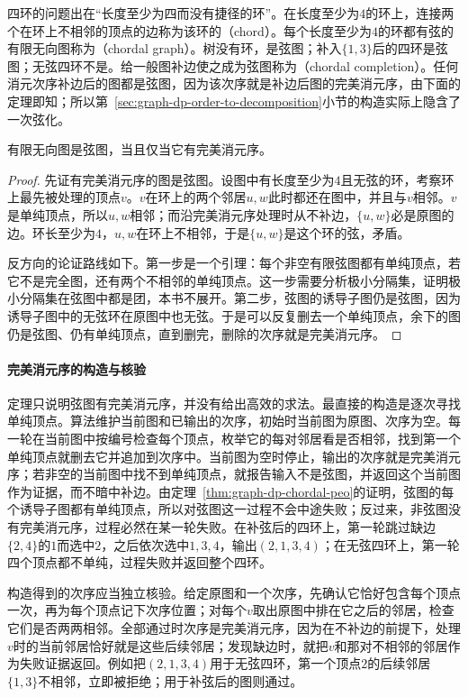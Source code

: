 四环的问题出在“长度至少为四而没有捷径的环”。在长度至少为$4$的环上，连接两个在环上不相邻的顶点的边称为该环的（chord）。每个长度至少为$4$的环都有弦的有限无向图称为（chordal graph）。树没有环，是弦图；补入$\{1,3\}$后的四环是弦图；无弦四环不是。给一般图补边使之成为弦图称为（chordal completion）。任何消元次序补边后的图都是弦图，因为该次序就是补边后图的完美消元序，由下面的定理即知；所以第~\ref{sec:graph-dp-order-to-decomposition}小节的构造实际上隐含了一次弦化。

\begin{theorem}[弦图与完美消元序]
\label{thm:graph-dp-chordal-peo}
有限无向图是弦图，当且仅当它有完美消元序。
\end{theorem}

\begin{proof}
先证有完美消元序的图是弦图。设图中有长度至少为$4$且无弦的环，考察环上最先被处理的顶点$v$。$v$在环上的两个邻居$u,w$此时都还在图中，并且与$v$相邻。$v$是单纯顶点，所以$u,w$相邻；而沿完美消元序处理时从不补边，$\{u,w\}$必是原图的边。环长至少为$4$，$u,w$在环上不相邻，于是$\{u,w\}$是这个环的弦，矛盾。

反方向的论证路线如下。第一步是一个引理：每个非空有限弦图都有单纯顶点，若它不是完全图，还有两个不相邻的单纯顶点。这一步需要分析极小分隔集，证明极小分隔集在弦图中都是团，本书不展开。第二步，弦图的诱导子图仍是弦图，因为诱导子图中的无弦环在原图中也无弦。于是可以反复删去一个单纯顶点，余下的图仍是弦图、仍有单纯顶点，直到删完，删除的次序就是完美消元序。
\end{proof}

\paragraph{完美消元序的构造与核验}
定理只说明弦图有完美消元序，并没有给出高效的求法。最直接的构造是逐次寻找单纯顶点。算法维护当前图和已输出的次序，初始时当前图为原图、次序为空。每一轮在当前图中按编号检查每个顶点，枚举它的每对邻居看是否相邻，找到第一个单纯顶点就删去它并追加到次序中。当前图为空时停止，输出的次序就是完美消元序；若非空的当前图中找不到单纯顶点，就报告输入不是弦图，并返回这个当前图作为证据，而不暗中补边。由定理~\ref{thm:graph-dp-chordal-peo}的证明，弦图的每个诱导子图都有单纯顶点，所以对弦图这一过程不会中途失败；反过来，非弦图没有完美消元序，过程必然在某一轮失败。在补弦后的四环上，第一轮跳过缺边$\{2,4\}$的$1$而选中$2$，之后依次选中$1,3,4$，输出$(2,1,3,4)$；在无弦四环上，第一轮四个顶点都不单纯，过程失败并返回整个四环。

构造得到的次序应当独立核验。给定原图和一个次序，先确认它恰好包含每个顶点一次，再为每个顶点记下次序位置；对每个$v$取出原图中排在它之后的邻居，检查它们是否两两相邻。全部通过时次序是完美消元序，因为在不补边的前提下，处理$v$时的当前邻居恰好就是这些后续邻居；发现缺边时，就把$v$和那对不相邻的邻居作为失败证据返回。例如把$(2,1,3,4)$用于无弦四环，第一个顶点$2$的后续邻居$\{1,3\}$不相邻，立即被拒绝；用于补弦后的图则通过。

